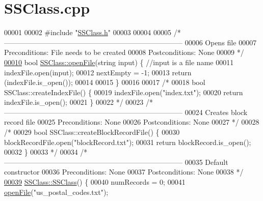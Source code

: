 \hypertarget{SSClass_8cpp_source}{}\section{S\+S\+Class.\+cpp}

\begin{DoxyCode}
00001 
00002 \textcolor{preprocessor}{#include "\hyperlink{SSClass_8h}{SSClass.h}"}
00003 
00004 
00005 \textcolor{comment}{/*---------------------------------------------------------------------------}
00006 \textcolor{comment}{    Opens file}
00007 \textcolor{comment}{    Preconditions:   File needs to be created}
00008 \textcolor{comment}{    Postconditions:  None}
00009 \textcolor{comment}{*/}
\hyperlink{classSSClass_a92e012441608ea36f3013fb3cbea9da8}{00010} \textcolor{keywordtype}{bool} \hyperlink{classSSClass_a92e012441608ea36f3013fb3cbea9da8}{SSClass::openFile}(\textcolor{keywordtype}{string} input) \{ \textcolor{comment}{//input is a file name}
00011     indexFile.open(input);
00012     nextEmpty = -1;
00013     \textcolor{keywordflow}{return} (indexFile.is\_open());
00014 
00015 \}
00016 
00017 \textcolor{comment}{/*}
00018 \textcolor{comment}{bool SSClass::createIndexFile() \{}
00019 \textcolor{comment}{    indexFile.open("index.txt");}
00020 \textcolor{comment}{    return indexFile.is\_open();}
00021 \textcolor{comment}{\}}
00022 \textcolor{comment}{*/}
00023 \textcolor{comment}{/*---------------------------------------------------------------------------}
00024 \textcolor{comment}{    Creates block record file}
00025 \textcolor{comment}{    Preconditions:   None}
00026 \textcolor{comment}{    Postconditions:  None}
00027 \textcolor{comment}{*/}
00028 \textcolor{comment}{/*}
00029 \textcolor{comment}{bool SSClass::createBlockRecordFile() \{}
00030 \textcolor{comment}{    blockRecordFile.open("blockRecord.txt");}
00031 \textcolor{comment}{    return blockRecord.is\_open();}
00032 \textcolor{comment}{\}}
00033 \textcolor{comment}{*/}
00034 \textcolor{comment}{/*---------------------------------------------------------------------------}
00035 \textcolor{comment}{    Default constructor}
00036 \textcolor{comment}{    Preconditions:   None}
00037 \textcolor{comment}{    Postconditions:  None}
00038 \textcolor{comment}{*/}
\hyperlink{classSSClass_ab4603d6a236c4fa65f896a1158c0d2ef}{00039} \hyperlink{classSSClass_ab4603d6a236c4fa65f896a1158c0d2ef}{SSClass::SSClass}() \{
00040     numRecords = 0;
00041     \hyperlink{classSSClass_a92e012441608ea36f3013fb3cbea9da8}{openFile}(\textcolor{stringliteral}{"us\_postal\_codes.txt"});

\end{DoxyCode}
